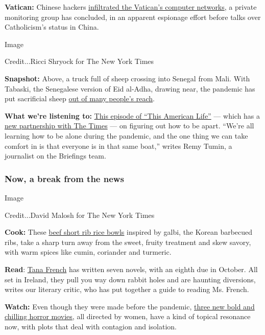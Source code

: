 \textbf{Vatican:} Chinese hackers
\href{https://www.nytimes.com/2020/07/28/us/politics/china-vatican-hack.html}{infiltrated
the Vatican's computer networks}, a private monitoring group has
concluded, in an apparent espionage effort before talks over
Catholicism's status in China.

Image

Credit...Ricci Shryock for The New York Times

\textbf{Snapshot:} Above, a truck full of sheep crossing into Senegal
from Mali. With Tabaski, the Senegalese version of Eid al-Adha, drawing
near, the pandemic has put sacrificial sheep
\href{https://www.nytimes.com/2020/07/29/world/africa/senegal-tabaski-sheep-eid-adha.html}{out
of many people's reach}.

\textbf{What we're listening to:}
\href{https://www.thisamericanlife.org/711/how-to-be-alone}{This episode
of ``This American Life''} --- which has a
\href{https://www.nytimes.com/2020/07/22/business/media/new-york-times-serial.html}{new
partnership with The Times} --- on figuring out how to be apart. ``We're
all learning how to be alone during the pandemic, and the one thing we
can take comfort in is that everyone is in that same boat,'' writes Remy
Tumin, a journalist on the Briefings team.

\hypertarget{now-a-break-from-the-news}{%
\subsubsection{Now, a break from the
news}\label{now-a-break-from-the-news}}

Image

Credit...David Malosh for The New York Times

\textbf{Cook:} These
\href{https://cooking.nytimes.com/recipes/1020046-beef-short-rib-rice-bowls}{beef
short rib rice bowls} inspired by galbi, the Korean barbecued ribs, take
a sharp turn away from the sweet, fruity treatment and skew savory, with
warm spices like cumin, coriander and turmeric.

\textbf{Read}:
\href{https://www.nytimes.com/2020/07/29/books/the-essential-tana-french.html}{Tana
French} has written seven novels, with an eighth due in October. All set
in Ireland, they pull you way down rabbit holes and are haunting
diversions, writes our literary critic, who has put together a guide to
reading Ms. French.

\textbf{Watch:} Even though they were made before the pandemic,
\href{https://www.nytimes.com/2020/07/29/movies/horror-she-dies-tomorrow-relic-amulet.html}{three
new bold and chilling horror movies,} all directed by women, have a kind
of topical resonance now, with plots that deal with contagion and
isolation.

